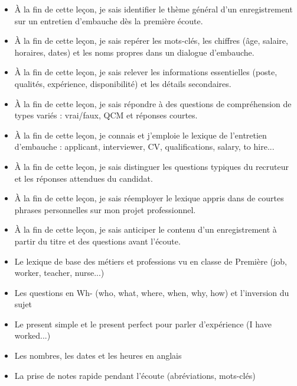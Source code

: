 \documentclass[11pt]{article}
\begin{document}
\begin{objectifs}
\begin{itemize}
\item À la fin de cette leçon, je sais identifier le thème général d'un enregistrement sur un entretien d'embauche dès la première écoute.
\item À la fin de cette leçon, je sais repérer les mots-clés, les chiffres (âge, salaire, horaires, dates) et les noms propres dans un dialogue d'embauche.
\item À la fin de cette leçon, je sais relever les informations essentielles (poste, qualités, expérience, disponibilité) et les détails secondaires.
\item À la fin de cette leçon, je sais répondre à des questions de compréhension de types variés : vrai/faux, QCM et réponses courtes.
\item À la fin de cette leçon, je connais et j'emploie le lexique de l'entretien d'embauche : applicant, interviewer, CV, qualifications, salary, to hire...
\item À la fin de cette leçon, je sais distinguer les questions typiques du recruteur et les réponses attendues du candidat.
\item À la fin de cette leçon, je sais réemployer le lexique appris dans de courtes phrases personnelles sur mon projet professionnel.
\item À la fin de cette leçon, je sais anticiper le contenu d'un enregistrement à partir du titre et des questions avant l'écoute.
\end{itemize}
\end{objectifs}

\begin{prerequis}
\begin{itemize}
\item Le lexique de base des métiers et professions vu en classe de Première (job, worker, teacher, nurse...)
\item Les questions en Wh- (who, what, where, when, why, how) et l'inversion du sujet
\item Le present simple et le present perfect pour parler d'expérience (I have worked...)
\item Les nombres, les dates et les heures en anglais
\item La prise de notes rapide pendant l'écoute (abréviations, mots-clés)
\end{itemize}
\end{prerequis}

\newpage
\end{document}
